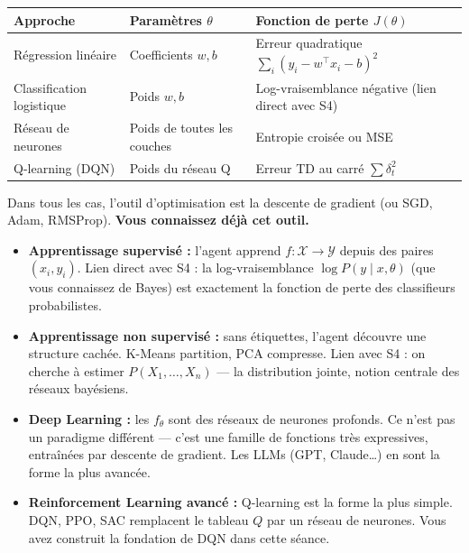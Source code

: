 \documentclass[11pt,a4paper]{article}
\begin{document}
\begin{center}
\renewcommand{\arraystretch}{1.4}
\begin{tabular}{lp{5cm}p{5cm}}
\toprule
\textbf{Approche} & \textbf{Paramètres $\theta$} & \textbf{Fonction de perte $J(\theta)$} \\
\midrule
Régression linéaire & Coefficients $w, b$ & Erreur quadratique $\sum_i (y_i - w^\top x_i - b)^2$ \\
Classification logistique & Poids $w, b$ & Log-vraisemblance négative (lien direct avec S4) \\
Réseau de neurones & Poids de toutes les couches & Entropie croisée ou MSE \\
Q-learning (DQN) & Poids du réseau Q & Erreur TD au carré $\sum \delta_t^2$ \\
\bottomrule
\end{tabular}
\end{center}

Dans tous les cas, l'outil d'optimisation est la descente de gradient (ou SGD, Adam, RMSProp). \textbf{Vous connaissez déjà cet outil.}

\begin{itemize}
    \item \textbf{Apprentissage supervisé :} l'agent apprend $f : \mathcal{X} \to \mathcal{Y}$ depuis des paires $(x_i, y_i)$. Lien direct avec S4 : la log-vraisemblance $\log P(y \mid x, \theta)$ (que vous connaissez de Bayes) est exactement la fonction de perte des classifieurs probabilistes.

    \item \textbf{Apprentissage non supervisé :} sans étiquettes, l'agent découvre une structure cachée. K-Means partition, PCA compresse. Lien avec S4 : on cherche à estimer $P(X_1, \ldots, X_n)$ --- la distribution jointe, notion centrale des réseaux bayésiens.

    \item \textbf{Deep Learning :} les $f_\theta$ sont des réseaux de neurones profonds. Ce n'est pas un paradigme différent --- c'est une famille de fonctions très expressives, entraînées par descente de gradient. Les LLMs (GPT, Claude\ldots) en sont la forme la plus avancée.

    \item \textbf{Reinforcement Learning avancé :} Q-learning est la forme la plus simple. DQN, PPO, SAC remplacent le tableau $Q$ par un réseau de neurones. Vous avez construit la fondation de DQN dans cette séance.
\end{itemize}
\end{document}
